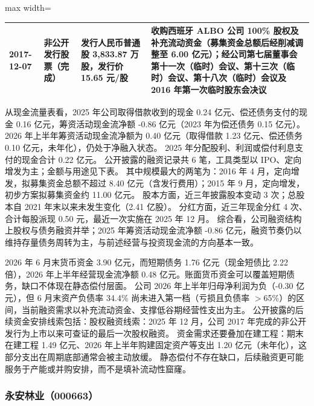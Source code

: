\begin{center}
\begin{adjustbox}{max width=\textwidth}
\begin{tabular}{@{}p{1.45cm}p{2.55cm}p{4.05cm}p{4.95cm}@{}}
2017-12-07 & 非公开发行股票（完成） & 发行人民币普通股 3,\allowbreak{}833.87 万股，\allowbreak{}发行价 15.65 元/\allowbreak{}股 & 收购西班牙 ALBO 公司 100\% 股权及补充流动资金（募集资金总额后经削减调整至 6.00 亿元）；经公司第七届董事会第十一次（临时）会议、\allowbreak{}第十三次（临时）会议、\allowbreak{}第十八次（临时）会议及 2016 年第一次临时股东会决议 \\
\bottomrule
\end{tabular}
\end{adjustbox}
\end{center}

 从现金流量表看，2025 年公司取得借款收到的现金 0.24 亿元、偿还债务支付的现金 0.16 亿元，筹资活动现金流净额 -0.86 亿元（2023 年为偿还债务 0.15 亿元）。 2026 年上半年筹资活动现金流净额为 0.40 亿元（取得借款 1.23 亿元、偿还债务 0.10 亿元，未年化），仍处于净融入状态。 2025 年分配股利、利润或偿付利息支付的现金合计 0.22 亿元。 公开披露的融资记录共 6 笔，工具类型以 IPO、定向增发为主；金额与用途见下表。 其中规模最大的两笔为：2016 年 4 月，定向增发，拟募集资金总额不超过 8.40 亿元（含发行费用）；2015 年 9 月，定向增发，初步方案拟募集资金约 11.00 亿元。 股本方面，近三年披露股本变动 3 次；总股本自 2021 年末以来未发生变化（2.41 亿股）。 分红方面，近三年现金分红 4 次、合计每股派现 0.50 元，最近一次实施在 2025 年 12 月。 综合看，公司融资结构上股权与债务融资并举；2025 年筹资活动现金流净额 -0.86 亿元，融资节奏仍以维持存量债务周转为主，与前述经营与投资现金流的方向基本一致。

 2026 年 6 月末货币资金 3.90 亿元，而短期债务 1.76 亿元（现金短债比 2.22 倍），2026 年上半年经营现金流净额 0.48 亿元。账面货币资金可以覆盖短期债务，缺口不体现在静态偿付层面。 公司 2026 年上半年归母净利润为负（-0.30 亿元），但 6 月末资产负债率 34.4\% 尚未进入第一档（亏损且负债率 $>$65\%）的区间，当前融资需求以补充流动资金、支撑低谷期经营性支出为主。 公开披露的后续资金安排线索包括：股权融资线索：2025 年 12 月，公司 2017 年完成的非公开发行为上市以来可查证的最后一次股权融资。 资金需求还要叠加在建工程：期末在建工程 1.49 亿元、2026 年上半年购建固定资产等支出 1.20 亿元（未年化），这部分支出在周期底部通常会被主动放缓。 静态偿付不存在缺口，后续融资更可能服务于产能或并购安排，而不是填补流动性窟窿。




\subsubsection{永安林业（000663）}
\label{co:000663}

